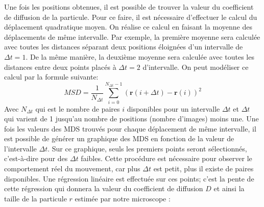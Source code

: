 \documentclass[conference]{IEEEtran}
\begin{document}
Une fois les positions obtenues, il est possible de trouver la valeur du coefficient de diffusion de la particule. 
Pour ce faire, il est nécessaire d'effectuer le calcul du déplacement quadratique moyen. On réalise ce calcul en faisant la moyenne des déplacements de même intervalle. Par exemple, 
la première moyenne sera calculée avec toutes les distances séparant deux positions éloignées d'un intervalle de $\Delta t=1$. De la même manière, la deuxième moyenne sera calculée avec toutes les distances
entre deux points placés à $\Delta t=2$ d'intervalle. On peut modéliser ce calcul par la formule suivante: 
\begin{equation}
  MSD = \frac{1}{N_{\Delta t}} \sum_{i=0}^{N_{\Delta t} - 1} \left( \mathbf{r}(i+\Delta t) - \mathbf{r}(i) \right)^2
\end{equation}
Avec $N_{\Delta t}$ qui est le nombre de paires $i$ disponibles pour un intervalle $\Delta t$ et $\Delta t$ qui varient de 1 jusqu'au nombre de positions (nombre d'images) moins une. 
Une fois les valeurs des MDS trouvés pour chaque déplacement de même intervalle, il est possible de générer un graphique 
des MDS en fonction de la valeur de l'intervalle $\Delta t$. Sur ce graphique, seuls les premiers points seront sélectionnés, c'est-à-dire pour des $\Delta t$ faibles.
Cette procédure est nécessaire pour observer le comportement réel du mouvement, car plus $\Delta t$ est petit, plus il existe de paires disponibles. 
Une régression linéaire est effectuée sur
ces points; c'est la pente de cette régression qui donnera la valeur du coefficient de diffusion $D$ et ainsi la taille de la particule $r$ estimée par notre microscope :
\end{document}

